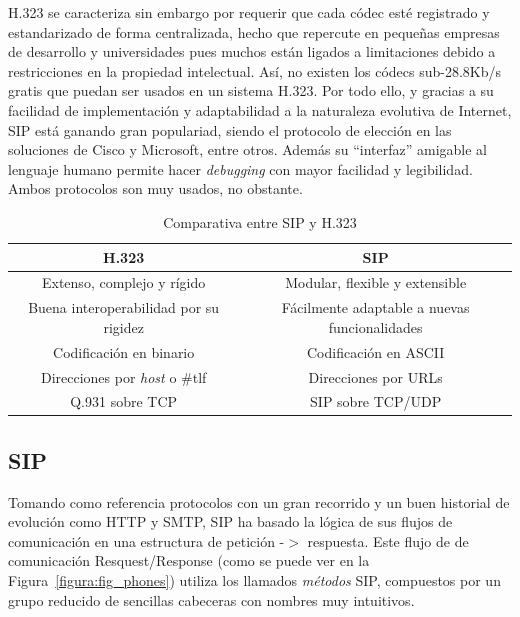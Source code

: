 \documentclass[a4paper, 12pt]{book}
\begin{document}
H.323 se caracteriza sin embargo por requerir que cada códec esté registrado y estandarizado de forma centralizada, hecho que repercute en pequeñas empresas de desarrollo y universidades pues muchos están ligados a limitaciones debido a restricciones en la propiedad intelectual. Así, no existen los códecs sub-28.8Kb/s gratis que puedan ser usados en un sistema H.323. Por todo ello, y gracias a su facilidad de implementación y adaptabilidad a la naturaleza evolutiva de Internet, SIP está ganando gran populariad, siendo el protocolo de elección en las soluciones de Cisco y Microsoft, entre otros. Además su  ``interfaz'' amigable al lenguaje humano permite hacer \emph{debugging} con mayor facilidad y legibilidad. Ambos protocolos son muy usados, no obstante.


\begin{table} [h]
  \begin{center}
    \begin{tabular}{| c | c |}
    \hline
    \textbf{H.323} & \textbf{SIP} \\ \hline
    Extenso, complejo y rígido & Modular, flexible y extensible\\\hline
    Buena interoperabilidad por su rigidez & Fácilmente adaptable a nuevas funcionalidades\\\hline
    Codificación en binario & Codificación en ASCII \\\hline
    Direcciones por \emph{host} o \#tlf & Direcciones por URLs \\ \hline
    Q.931 sobre TCP & SIP sobre TCP/UDP \\\hline
    \end{tabular}
    \label{tabla:SIPvsH.323}
    \caption{Comparativa entre SIP y H.323}
  \end{center}
\end{table}

\subsection{SIP}
\label{sec:sip}

Tomando como referencia protocolos con un gran recorrido y un buen historial de evolución como HTTP y SMTP, SIP ha basado la lógica de sus flujos de comunicación en una estructura de petición -$>$ respuesta. Este flujo de de comunicación Resquest/Response (como se puede ver en la Figura~\ref{figura:fig_phones}) utiliza los llamados \emph{métodos} SIP, compuestos por un grupo reducido de sencillas cabeceras con nombres muy intuitivos.
\end{document}

